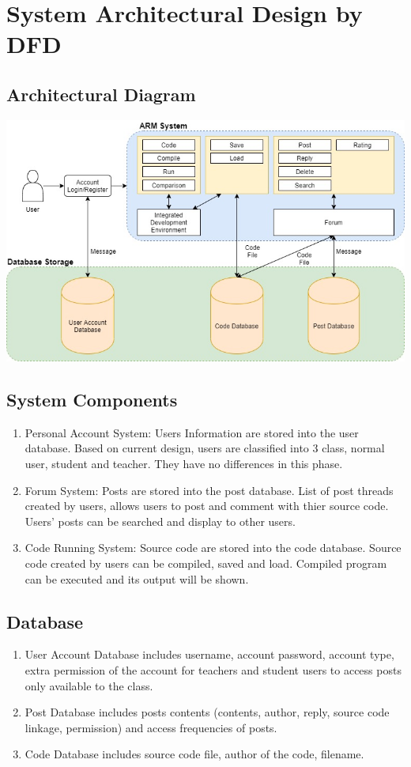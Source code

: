 \chapter{System Architectural Design by DFD}
\section{Architectural Diagram}
\includegraphics[scale=0.5]{Doc/Graphics/architectural_diagram}
\newpage
\section{System Components}
\begin{enumerate}
	\item Personal Account System: Users Information are stored into the user database. Based on current design, users are classified into 3 class, normal user, student and teacher. They have no differences in this phase.
	\item Forum System: Posts are stored into the post database. List of post threads created by users, allows users to post and comment with thier source code. Users' posts can be searched and display to other users.
	\item Code Running System: Source code are stored into the code database. Source code created by users can be compiled, saved and load. Compiled program can be executed and its output will be shown.
\end{enumerate}
\section{Database}
\begin{enumerate}
	\item User Account Database includes username, account password, account type, extra permission of the account for teachers and student users to access posts only available to the class.
	\item Post Database includes posts contents (contents, author, reply, source code linkage, permission) and access frequencies of posts.
  \item Code Database includes source code file, author of the code, filename.
\end{enumerate}

